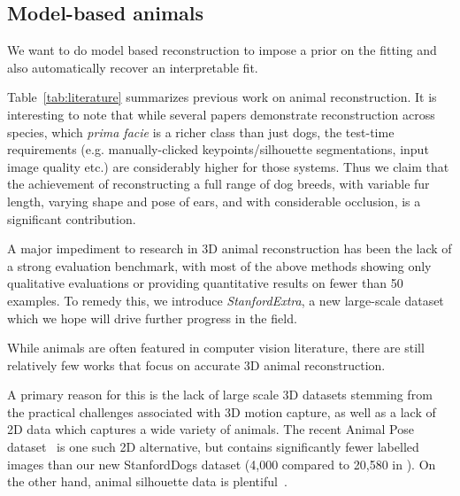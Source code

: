 
\subsection{Model-based animals}

    We want to do model based reconstruction to impose a prior on the fitting and also automatically recover an interpretable fit.

    

    Table~\ref{tab:literature} summarizes previous work on animal reconstruction.
    It is interesting to note that while several papers demonstrate reconstruction across species, which {\em prima facie} is a richer class than just dogs, the test-time requirements (e.g. manually-clicked keypoints/silhouette segmentations, input image quality etc.) are considerably higher for those systems.
    Thus we claim that the achievement of reconstructing a full range of dog breeds, 
    with variable fur length, varying shape and pose of ears, and with considerable occlusion, is a significant contribution.

    A major impediment to research in 3D animal reconstruction has been the lack of a strong evaluation benchmark, with most of the above methods showing only qualitative evaluations or providing quantitative results on fewer than 50 examples. To remedy this, we introduce \emph{StanfordExtra}, a new large-scale dataset which we hope will drive further progress in the field. 

    While animals are often featured in computer vision literature, there are still relatively few works that focus on accurate 3D animal reconstruction. 

    A primary reason for this is the lack of large scale 3D datasets stemming from the practical challenges associated with 3D motion capture, as well as a lack of 2D data which captures a wide variety of animals. The recent Animal Pose dataset~\cite{animalpose} is one such 2D alternative, but contains significantly fewer labelled images than our new StanfordDogs dataset (4,000 compared to 20,580 in ). 
    On the other hand, animal silhouette data is plentiful~\cite{lin2014microsoft,everingham2010pascal,DAVIS2017-2nd}.


